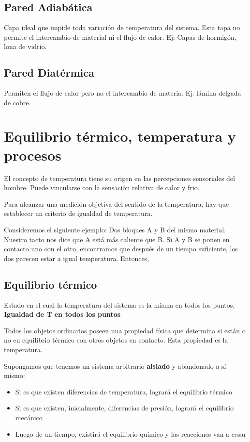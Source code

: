 \documentclass[12pt,twocolumn,a4paper]{report}
\begin{document}
\section*{Pared Adiabática}
Capa ideal que impide toda variación de temperatura del sistema. Esta tapa no permite el intercambio de material ni el flujo de calor. Ej: Capas de hormigón, lona de vidrio.
\section*{Pared Diatérmica}
Permiten el flujo de calor pero no el intercambio de materia. Ej: lámina delgada de cobre.




\twocolumn


\chapter*{Equilibrio térmico, temperatura y procesos}
El concepto de temperatura tiene su origen en las percepciones sensoriales del hombre. Puede vincularse con la sensación relativa de calor y frio.

Para alcanzar una medición objetiva del sentido de la temperatura, hay que establecer un criterio de igualdad de temperatura.

Consideremos el siguiente ejemplo: Dos bloques A y B del mismo material. Nuestro tacto nos dice que A está más caliente que B. Si A y B se ponen en contacto uno con el otro, encontramos que después de un tiempo suficiente, los dos parecen estar a igual temperatura. Entonces,
\section*{Equilibrio térmico}
Estado en el cual la temperatura del sistema es la misma en todos los puntos. \textbf{Igualdad de T en todos los puntos}

Todos los objetos ordinarios poseen una propiedad física que determina si están o no en equilibrio térmico con otros objetos en contacto. Esta propiedad es la temperatura.

Supongamos que tenemos un sistema arbitrario \textbf{aislado} y abandonado a sí mismo: 
\begin{itemize}
  \setlength\itemsep{0.001cm}
  \item {Si es que existen diferencias de temperatura, logrará el equilibrio térmico}
  \item {Si es que existen, inicialmente, diferencias de presión, logrará el equilibrio mecánico}
  \item {Luego de un tiempo, existirá el equilibrio químico y las reacciones van a cesar}
\end{itemize}
\end{document}
